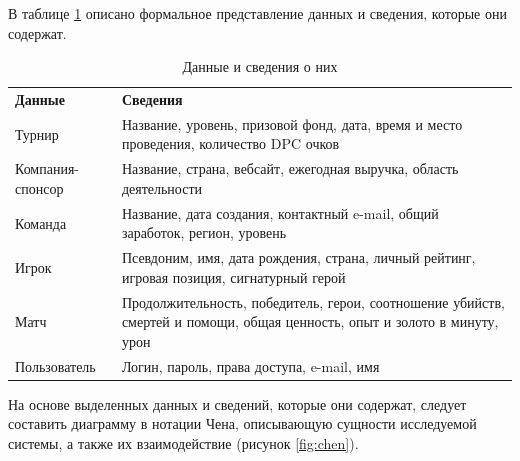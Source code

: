 В таблице \ref{tabular:data_info} описано формальное представление данных и сведения, которые они содержат.

\begin{table}[h!]
	\centering
	\caption{\label{tabular:data_info}Данные и сведения о них}
	\begin{tabular}{|p{3 cm}|p{12 cm}|}
		\cline{1-2}
		\textbf{Данные}  & \textbf{Сведения}                                                                           \\ \cline{1-2}
		Турнир           & Название, уровень, призовой фонд, дата, время и место проведения, количество DPC очков   \\ \cline{1-2}
		Компания-спонсор & Название, страна, вебсайт, ежегодная выручка, область деятельности                \\ \cline{1-2}
		Команда          & Название, дата создания, контактный e-mail, общий заработок, регион, уровень             \\ \cline{1-2}
		Игрок            & Псевдоним, имя, дата рождения, страна, личный рейтинг, игровая позиция, сигнатурный герой   \\ \cline{1-2}
		Матч             & Продолжительность, победитель, герои, соотношение убийств, смертей и помощи, общая ценность, опыт и золото в минуту, урон\\ \cline{1-2}
		Пользователь     & Логин, пароль, права доступа, e-mail, имя                                                 \\ \cline{1-2}
	\end{tabular}%
\end{table}

На основе выделенных данных и сведений, которые они содержат, следует составить диаграмму в нотации Чена, описывающую сущности исследуемой системы, а также их взаимодействие (рисунок \ref{fig:chen}).

\newpage

